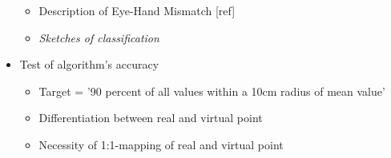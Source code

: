 \begin{itemize}
	\begin{itemize}
		\item Description of Eye-Hand Mismatch [ref]
		\item \textit{Sketches of classification}
	\end{itemize}
	\item Test of algorithm's accuracy
	\begin{itemize}
		\item Target = '90 percent of all values within a 10cm radius of mean value'
		\item Differentiation between real and virtual point
		\item Necessity of 1:1-mapping of real and virtual point
	\end{itemize}
\end{itemize}
